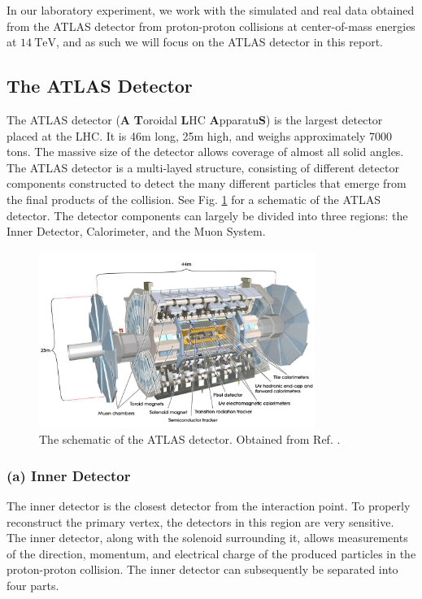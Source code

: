 \documentclass[a4paper]{report}
\numberwithin{equation}{section}
\begin{document}
In our laboratory experiment, we work with the simulated and real data obtained from the ATLAS detector from proton-proton collisions at center-of-mass
energies at $\SI{14}{\tera\electronvolt}$, and as such we will focus on the ATLAS detector in this report.

\subsection{The ATLAS Detector}

The ATLAS detector (\textbf{A} \textbf{T}oroidal \textbf{L}HC \textbf{A}pparatu\textbf{S}) is the largest detector placed at the LHC. It is 46m long, 25m high, 
and weighs approximately 7000 tons. The massive size of the detector allows coverage of almost all solid angles. The ATLAS detector is a multi-layed structure, 
consisting of different detector components constructed to detect the many 
different particles that emerge from the final products of the collision. See Fig. \ref{fig:atlas_detector} for a schematic of the ATLAS detector. The detector components can largely 
be divided into three regions: the Inner Detector, Calorimeter, and the Muon System. 

\begin{figure}[htpb]
    \centering
    \includegraphics[width=0.8\textwidth]{ATLASDetector.jpg}
    \caption{The schematic of the ATLAS detector. Obtained from Ref. \cite{ATLASFactSheet}.}
    \label{fig:atlas_detector}
\end{figure}

\subsubsection{(a) Inner Detector}

The inner detector is the closest detector from the interaction point. To properly reconstruct the primary vertex, the detectors in this region are very 
sensitive. The inner detector, along with the solenoid surrounding it, allows measurements of the direction, momentum, and electrical charge of the 
produced particles in the proton-proton collision. The inner detector can subsequently be separated into four parts. \\ 
\end{document}
